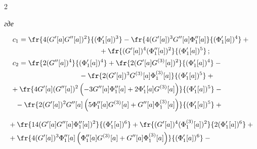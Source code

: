 \begin{multicols}{2}
\begin{equation*}
 \end{equation*}


\textit{где}


  \begin{align*}


  c_{1}&=


 \fr{4 (G'[a] G''[a])^2}{(\Phi_1'[a])^3}-


 \fr{4 (G'[a])^3 G''[a] \Phi_1''[a]}{(\Phi_1'[a])^4}+{}\\


 &\hspace*{40mm}{}+


 \fr{(G'[a])^4 (\Phi_1''[a])^2}{(\Phi_1'[a])^5}\,;


\\


 c_{2}&=


 \fr{2 (G''[a])^4}{(\Phi_1'[a])^4}


 + \fr{2 (G'[a] G^{(3)}[a])^2}{(\Phi_1'[a])^4}


 - {}\\


 &\hspace*{30mm}{}-\fr{2 (G'[a])^3 G^{(3)}[a] \Phi_1^{(3)}[a]}{(\Phi_1'[a])^5}+{}\\


&\hspace*{-11.32532pt}{} +\fr{4 G'[a] (G''[a])^2 \left(-3 G''[a] \Phi_1''[a]+


 2 \Phi_1'[a] G^{(3)}[a]\right)}{(\Phi_1'[a])^5}-{}


\\


&\hspace*{-4.79753pt}{} -\fr{2 (G'[a])^2 G''[a] \left(5 \Phi_1''[a] G^{(3)}[a]+G''[a]


 \Phi_1^{(3)}[a]\right)}{(\Phi_1'[a])^5} +{}


 \end{align*}


  \begin{align*}


 &{}+\fr{14 (G'[a] G''[a] \Phi_1''[a])^2}{(\Phi_1'[a])^6}


 + \fr{(G'[a])^4 (\Phi_1^{(3)}[a])^2}{2 (\Phi_1'[a])^6}+{}


\\


&{} +\fr{4 (G'[a])^3 \Phi_1''[a] \left(\Phi_1''[a] G^{(3)}[a]+


  G''[a] \Phi_1^{(3)}[a]\right)}{(\Phi_1'[a])^6}-{}


\\



\end{align*}
\end{multicols}
